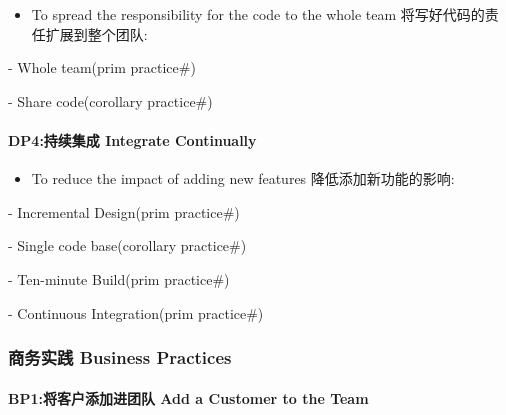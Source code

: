 \begin{itemize}
\tightlist
\item
  To spread the responsibility for the code to the whole team
  将写好代码的责任扩展到整个团队:\\
\end{itemize}

\begin{description}
\tightlist
\item[]
- Whole team(prim practice\#)

- Share code(corollary practice\#)
\end{description}

\hypertarget{dp4ux6301ux7eedux96c6ux6210-integrate-continually}{%
\paragraph{DP4:持续集成 Integrate
Continually}\label{dp4ux6301ux7eedux96c6ux6210-integrate-continually}}

\begin{itemize}
\tightlist
\item
  To reduce the impact of adding new features 降低添加新功能的影响:
\end{itemize}

\begin{description}
\tightlist
\item[]
- Incremental Design(prim practice\#)

- Single code base(corollary practice\#)

- Ten-minute Build(prim practice\#)

- Continuous Integration(prim practice\#)
\end{description}

\hypertarget{ux5546ux52a1ux5b9eux8df5-business-practices}{%
\subsubsection{商务实践 Business
Practices}\label{ux5546ux52a1ux5b9eux8df5-business-practices}}

\hypertarget{bp1ux5c06ux5ba2ux6237ux6dfbux52a0ux8fdbux56e2ux961f-add-a-customer-to-the-team}{%
\paragraph{BP1:将客户添加进团队 Add a Customer to the
Team}\label{bp1ux5c06ux5ba2ux6237ux6dfbux52a0ux8fdbux56e2ux961f-add-a-customer-to-the-team}}

